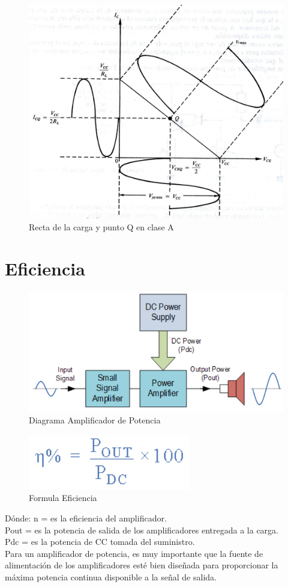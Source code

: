 \documentclass[12pt,a4paper]{article}
\begin{document}
\begin{figure}[hbtp]
\centering
\includegraphics[scale=1]{Circuitos/2.png}
\caption{Recta de la carga y punto Q en clase A}
\end{figure}

\section{Eficiencia}
\begin{figure}[hbtp]
\centering
\includegraphics[scale=0.7]{Circuitos/3.png}
\caption{Diagrama Amplificador de Potencia}
\end{figure}
\newpage
\begin{figure}[hbtp]
\centering
\includegraphics[scale=1]{Circuitos/4.png}
\caption{Formula Eficiencia}
\end{figure}
Dónde:
n = es la eficiencia del amplificador.\\
Pout = es la potencia de salida de los amplificadores entregada a la carga.\\
Pdc = es la potencia de CC tomada del suministro.\\
Para un amplificador de potencia, es muy importante que la fuente de alimentación de los amplificadores esté bien diseñada para proporcionar la máxima potencia continua disponible a la señal de salida.
\end{document}
